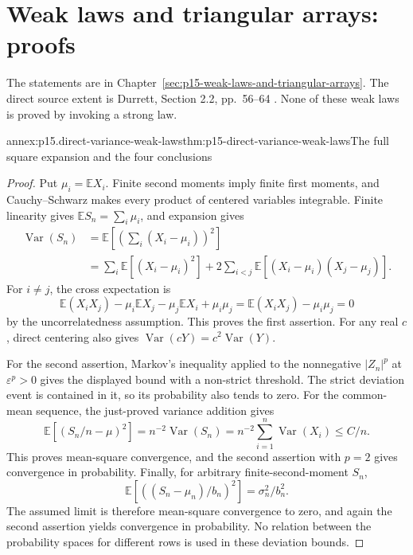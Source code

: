 \section{Weak laws and triangular arrays: proofs}
\label{sec:annex-p15-weak-laws-and-triangular-arrays}

The statements are in Chapter~\ref{sec:p15-weak-laws-and-triangular-arrays}.
The direct source extent is Durrett, Section 2.2, pp.~56--64
\cite{DurrettPTEAuthor2019}. None of these weak laws is proved by
invoking a strong law.

\begin{annexitem}{annex:p15.direct-variance-weak-laws}{thm:p15-direct-variance-weak-laws}{The full square expansion and the four conclusions}
\begin{proof}
Put \(\mu_i=\mathbb EX_i\). Finite second moments imply finite
first moments, and Cauchy--Schwarz makes every product of centered
variables integrable. Finite linearity gives
\(\mathbb ES_n=\sum_i\mu_i\), and expansion gives
\[
 \begin{aligned}
 \operatorname{Var}(S_n)
 &=\mathbb E\!\left[\left(\sum_i(X_i-\mu_i)\right)^2\right]\\
 &=\sum_i\mathbb E[(X_i-\mu_i)^2]
       +2\sum_{i<j}\mathbb E[(X_i-\mu_i)(X_j-\mu_j)].
 \end{aligned}
\]
For \(i\ne j\), the cross expectation is
\[
 \mathbb E(X_iX_j)-\mu_i\mathbb EX_j-\mu_j\mathbb EX_i+\mu_i\mu_j
       =\mathbb E(X_iX_j)-\mu_i\mu_j=0
\]
by the uncorrelatedness assumption. This proves the first assertion.
For any real \(c\), direct centering also gives
\(\operatorname{Var}(cY)=c^2\operatorname{Var}(Y)\).

For the second assertion, Markov's inequality applied to the
nonnegative \(|Z_n|^p\) at \(\varepsilon^p>0\) gives the displayed
bound with a non-strict threshold. The strict deviation event is
contained in it, so its probability also tends to zero.
For the common-mean sequence, the just-proved variance addition gives
\[
 \mathbb E[(S_n/n-\mu)^2]
   =n^{-2}\operatorname{Var}(S_n)
   =n^{-2}\sum_{i=1}^n\operatorname{Var}(X_i)\leq C/n.
\]
This proves mean-square convergence, and the second assertion with
\(p=2\) gives convergence in probability.
Finally, for arbitrary finite-second-moment \(S_n\),
\[
 \mathbb E\!\left[((S_n-\mu_n)/b_n)^2\right]=\sigma_n^2/b_n^2.
\]
The assumed limit is therefore mean-square convergence to zero,
and again the second assertion yields convergence in probability.
No relation between the probability spaces for different rows is
used in these deviation bounds.
\end{proof}
\end{annexitem}

